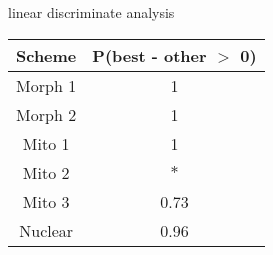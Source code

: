 \begin{subtable}[b]{0.3\linewidth}
  \caption{linear discriminate analysis}
  \centering
  \begin{tabular}{ c c }
    \hline
    Scheme & P(best - other \(>\) 0) \\ 
    \hline
    \hline
    Morph 1 & 1 \\
    Morph 2 & 1 \\
    Mito 1 & 1 \\ 
    Mito 2 & \(\ast\) \\ 
    Mito 3 & 0.73 \\ 
    Nuclear & 0.96 \\ 
    \hline
  \end{tabular}
  \label{lldif}
\end{subtable}
